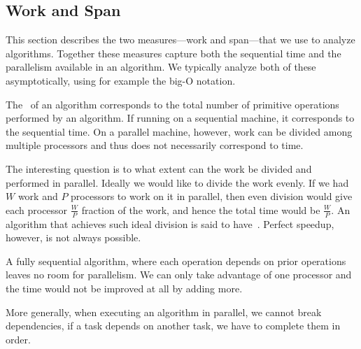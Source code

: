 





\subsection{Work and Span}

\begin{gram}
This section describes the two measures---work and span---that we use
to analyze algorithms.  Together these measures capture both the
sequential time and the parallelism available in an algorithm.
%
We typically analyze both of these asymptotically, using
for example the big-O notation.
%
\end{gram}

\begin{grp}
\begin{gram}[Work]
The~ of an algorithm corresponds to the total number of
primitive operations performed by an algorithm.  If running on a
sequential machine, it corresponds to the sequential time.
%
On a parallel machine, however, work can be divided among multiple
processors and thus does not necessarily correspond to time.
%

The interesting question is to what extent can the work be divided and
performed in parallel.  Ideally we would like to divide the work
evenly.  If we had $W$ work and $P$ processors to work on it in
parallel, then even division would give each processor $\frac{W}{P}$
fraction of the work, and hence the total time would be $\frac{W}{P}$.
%
An algorithm that achieves such ideal division is said to
have~.  Perfect speedup, however, is not always
possible.
%
\end{gram}

\begin{example}
A fully sequential algorithm, where each operation depends on prior
operations leaves no room for parallelism.
%
We can only take advantage of one processor and the time would not be
improved at all by adding more.  
%

More generally, when executing an algorithm in parallel, we cannot
break dependencies, if a task depends on another task, we have to
complete them in order.
\end{example}
\end{grp}

